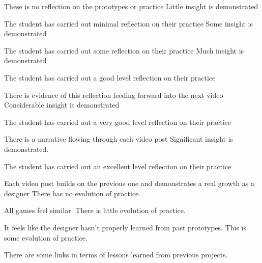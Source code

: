 \documentclass{../../fal_assignment}
\begin{document}
\begin{markingrubric}
	\grade\fail These is no reflection on the prototypes or practice
	\grade		Little insight is demonstrated
	\par		The student has carried out minimal reflection on their practice
	\grade		Some insight is demonstrated
	\par		The student has carried out some reflection on their practice
	\grade		Much insight is demonstrated
	\par		The student has carried out a good level reflection on their practice
	\par        There is evidence of this reflection feeding forward into the next video
	\grade		Considerable insight is demonstrated
	\par		The student has carried out a very good level reflection on their practice
	\par         There is a narrative flowing through each video post 
	\grade		Significant insight is demonstrated.
	\par		The student has carried out an excellent level reflection on their practice
	\par 		Each video post builds on the previous one and demonstrates a real growth as a designer
	\grade\fail There has no evolution of practice.
	\par All games feel similar.
	\grade There is little evolution of practice.
	\par It feels like the designer hasn't properly learned from past prototypes.
	\grade This is some evolution of practice.
	\par There are some links in terms of lessons learned from previous projects.

\end{markingrubric}
\end{document}
